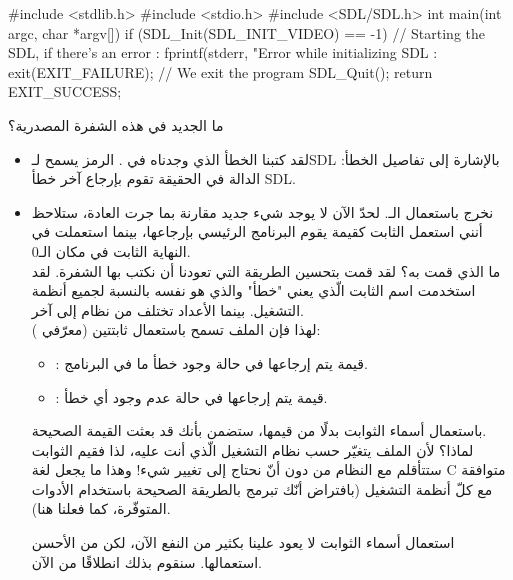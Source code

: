 \begin{Csource}
#include <stdlib.h>
#include <stdio.h>
#include <SDL/SDL.h>
int main(int argc, char *argv[])
{
	if (SDL_Init(SDL_INIT_VIDEO) == -1) // Starting the SDL, if there's an error :
	{
		fprintf(stderr, "Error while initializing SDL : %
		exit(EXIT_FAILURE); // We exit the program
	}
	SDL_Quit();
	return EXIT_SUCCESS;
}
\end{Csource}

ما الجديد في هذه الشفرة المصدرية؟

\begin{itemize}
	\item لقد كتبنا الخطأ الذي وجدناه في
	.
	الرمز 
	يسمح لـ\textenglish{SDL} 
	بالإشارة إلى تفاصيل الخطأ: الدالة 
	في الحقيقة تقوم بإرجاع آخر خطأ
	\textenglish{SDL}.
	\item نخرج باستعمال الـ.
	لحدّ الآن لا يوجد شيء جديد مقارنة بما جرت العادة، ستلاحظ أنني استعمل الثابت 
	كقيمة يقوم البرنامج الرئيسي بإرجاعها، بينما استعملت في النهاية الثابت 
	في مكان الـ0.\\
	ما الذي قمت به؟ لقد قمت بتحسين الطريقة التي تعودنا أن نكتب بها الشفرة. لقد استخدمت اسم الثابت الّذي يعني "خطأ" والذي هو نفسه بالنسبة لجميع أنظمة التشغيل. بينما الأعداد تختلف من نظام إلى آخر.\\
	لهذا فإن الملف
	تسمح باستعمال ثابتتين (معرّفي 
	):
	
	\begin{itemize}
		\item {}:
		قيمة يتم إرجاعها في حالة وجود خطأ ما في البرنامج.
		\item {}:
		قيمة يتم إرجاعها في حالة عدم وجود أي خطأ.
	\end{itemize}
	
	باستعمال أسماء الثوابت بدلًا من قيمها، ستضمن بأنك قد بعثت القيمة الصحيحة.\\
	لماذا؟ لأن الملف
	يتغيّر حسب نظام التشغيل الّذي أنت عليه، لذا فقيم الثوابت ستتأقلم مع النظام من دون أنّ نحتاج إلى تغيير شيء!  وهذا ما يجعل لغة \textenglish{C}
	متوافقة مع كلّ أنظمة التشغيل (بافتراض أنّك تبرمج بالطريقة الصحيحة باستخدام الأدوات المتوفّرة، كما فعلنا هنا).

\begin{information}
	استعمال أسماء الثوابت لا يعود علينا بكثير من النفع الآن، لكن من الأحسن استعمالها. سنقوم بذلك انطلاقًا من الآن.
\end{information}
\end{itemize}

